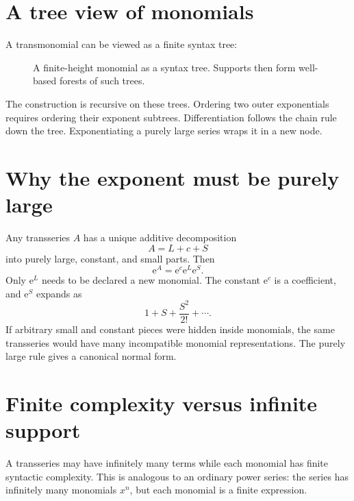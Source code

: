 \documentclass[11pt,openany]{book}
\theoremstyle{definition}
\theoremstyle{plain}
\theoremstyle{remark}
\newcommand{\e}{\mathrm{e}}
\begin{document}
\section{A tree view of monomials}

A transmonomial can be viewed as a finite syntax tree:

\begin{figure}[htbp]
\centering
{}
\caption{A finite-height monomial as a syntax tree. Supports then form well-based forests of such trees.}
\label{fig:monomial-tree}
\end{figure}

The construction is recursive on these trees. Ordering two outer exponentials requires ordering their exponent subtrees. Differentiation follows the chain rule down the tree. Exponentiating a purely large series wraps it in a new node.

\section{Why the exponent must be purely large}

Any transseries $A$ has a unique additive decomposition
\[
 A=L+c+S
\]
into purely large, constant, and small parts. Then
\[
 \e^A=\e^c\e^L\e^S.
\]
Only $\e^L$ needs to be declared a new monomial. The constant $\e^c$ is a coefficient, and $\e^S$ expands as
\[
 1+S+\frac{S^2}{2!}+\cdots.
\]
If arbitrary small and constant pieces were hidden inside monomials, the same transseries would have many incompatible monomial representations. The purely large rule gives a canonical normal form.

\section{Finite complexity versus infinite support}

A transseries may have infinitely many terms while each monomial has finite syntactic complexity. This is analogous to an ordinary power series: the series has infinitely many monomials $x^n$, but each monomial is a finite expression.
\end{document}
